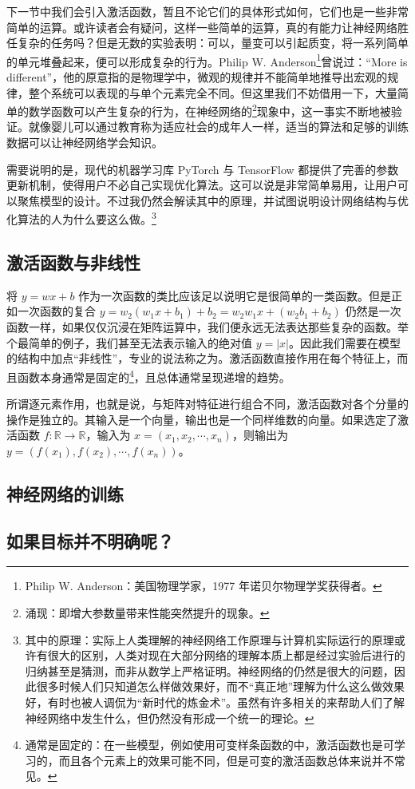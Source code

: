下一节中我们会引入激活函数，暂且不论它们的具体形式如何，它们也是一些非常简单的运算。或许读者会有疑问，这样一些简单的运算，真的有能力让神经网络胜任复杂的任务吗？但是无数的实验表明：可以，量变可以引起质变，将一系列简单的单元堆叠起来，便可以形成复杂的行为。Philip W. Anderson\footnote{Philip W. Anderson：美国物理学家，1977 年诺贝尔物理学奖获得者。}曾说过：“More is different”，他的原意指的是物理学中，微观的规律并不能简单地推导出宏观的规律，整个系统可以表现的与单个元素完全不同。但这里我们不妨借用一下，大量简单的数学函数可以产生复杂的行为，在神经网络的\footnote{涌现：即增大参数量带来性能突然提升的现象。}现象中，这一事实不断地被验证。就像婴儿可以通过教育称为适应社会的成年人一样，适当的算法和足够的训练数据可以让神经网络学会知识。

需要说明的是，现代的机器学习库 PyTorch 与 TensorFlow 都提供了完善的参数更新机制，使得用户不必自己实现优化算法。这可以说是非常简单易用，让用户可以聚焦模型的设计。不过我仍然会解读其中的原理，并试图说明设计网络结构与优化算法的人为什么要这么做。\footnote{其中的原理：实际上人类理解的神经网络工作原理与计算机实际运行的原理或许有很大的区别，人类对现在大部分网络的理解本质上都是经过实验后进行的归纳甚至是猜测，而非从数学上严格证明。神经网络的仍然是很大的问题，因此很多时候人们只知道怎么样做效果好，而不“真正地”理解为什么这么做效果好，有时也被人调侃为“新时代的炼金术”。虽然有许多相关的来帮助人们了解神经网络中发生什么，但仍然没有形成一个统一的理论。}

\newpage

\subsection{激活函数与非线性}

将 $y=wx+b$ 作为一次函数的类比应该足以说明它是很简单的一类函数。但是正如一次函数的复合 \( y = w_2(w_1x+b_1)+b_2 = w_2w_1x + (w_2b_1+b_2) \)
仍然是一次函数一样，如果仅仅沉浸在矩阵运算中，我们便永远无法表达那些复杂的函数。举个最简单的例子，我们甚至无法表示输入的绝对值 $y=|x|$。因此我们需要在模型的结构中加点“非线性”，专业的说法称之为。激活函数直接作用在每个特征上，而且函数本身通常是固定的\footnote{通常是固定的：在一些模型，例如使用可变样条函数的中，激活函数也是可学习的，而且各个元素上的效果可能不同，但是可变的激活函数总体来说并不常见。}，且总体通常呈现递增的趋势。

所谓逐元素作用，也就是说，与矩阵对特征进行组合不同，激活函数对各个分量的操作是独立的。其输入是一个向量，输出也是一个同样维数的向量。如果选定了激活函数 $f:\mathbb{R}\to\mathbb{R}$，输入为 $x = (x_1, x_2, \cdots, x_n)$，则输出为 $y = (f(x_1), f(x_2), \cdots, f(x_n))$。

\newpage

\subsection{神经网络的训练}
\subsection{如果目标并不明确呢？}